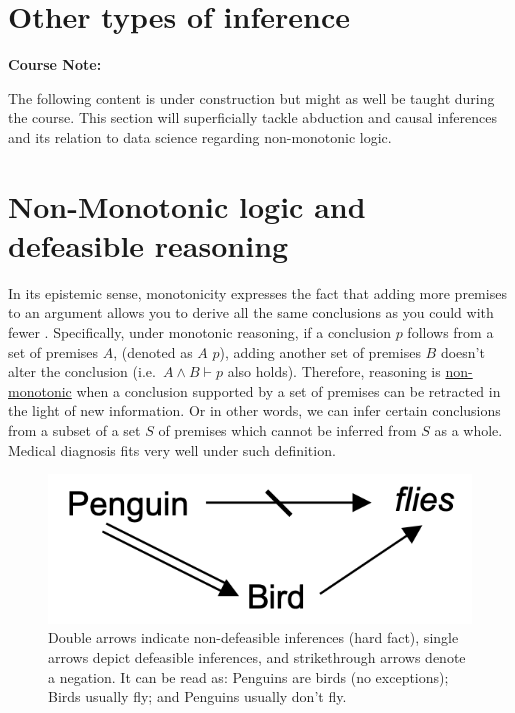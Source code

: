 \documentclass[
]{book}
\begin{document}
\hypertarget{other-types-of-inference}{%
\section{Other types of inference}\label{other-types-of-inference}}

\begin{notebox}

\begin{center}
\textbf{Course Note:}

\end{center}

The following content is under construction but might as well be taught during the course.
This section will superficially tackle abduction and causal inferences and its relation to data science regarding non-monotonic logic.

\end{notebox}

\hypertarget{non-monotonic-logic-and-defeasible-reasoning}{%
\section{Non-Monotonic logic and defeasible reasoning}\label{non-monotonic-logic-and-defeasible-reasoning}}

In its epistemic sense, monotonicity expresses the fact that adding more premises to an argument allows you to derive all the same conclusions as you could with fewer \citep{sep-logic-nonmonotonic}. Specifically, under monotonic reasoning, if a conclusion \(p\) follows from a set of premises \(A\), (denoted as \(A\) \vdash \(p\)), adding another set of premises \(B\) doesn't alter the conclusion (i.e.~\(A ∧ B \vdash p\) also holds). Therefore, reasoning is \href{https://plato.stanford.edu/entries/logic-nonmonotonic/}{non-monotonic} when a conclusion supported by a set of premises can be retracted in the light of new information. Or in other words, we can infer certain conclusions from a subset of a set \(S\) of premises which cannot be inferred from \(S\) as a whole. Medical diagnosis fits very well under such definition.

\begin{figure}

{\centering \includegraphics[width=0.33\linewidth]{Figures/PenguinFlies} 

}

\caption{Double arrows indicate non-defeasible inferences (hard fact), single arrows depict defeasible inferences, and strikethrough arrows denote a negation. It can be read as: Penguins are birds (no exceptions); Birds usually fly; and Penguins usually don’t fly.}\label{fig:tweety}
\end{figure}
\end{document}

